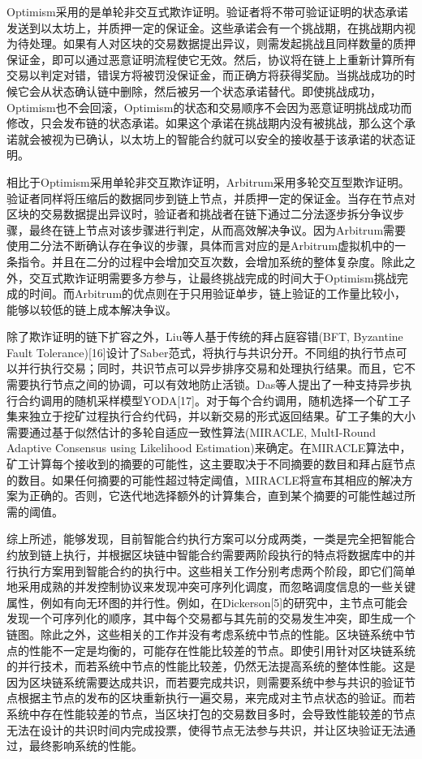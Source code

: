 Optimism采用的是单轮非交互式欺诈证明。验证者将不带可验证证明的状态承诺发送到以太坊上，并质押一定的保证金。这些承诺会有一个挑战期，在挑战期内视为待处理。如果有人对区块的交易数据提出异议，则需发起挑战且同样数量的质押保证金，即可以通过恶意证明流程使它无效。然后，协议将在链上上重新计算所有交易以判定对错，错误方将被罚没保证金，而正确方将获得奖励。当挑战成功的时候它会从状态确认链中删除，然后被另一个状态承诺替代。即使挑战成功，Optimism也不会回滚，Optimism的状态和交易顺序不会因为恶意证明挑战成功而修改，只会发布链的状态承诺。如果这个承诺在挑战期内没有被挑战，那么这个承诺就会被视为已确认，以太坊上的智能合约就可以安全的接收基于该承诺的状态证明。

相比于Optimism采用单轮非交互欺诈证明，Arbitrum采用多轮交互型欺诈证明。验证者同样将压缩后的数据同步到链上节点，并质押一定的保证金。当存在节点对区块的交易数据提出异议时，验证者和挑战者在链下通过二分法逐步拆分争议步骤，最终在链上节点对该步骤进行判定，从而高效解决争议。因为Arbitrum需要使用二分法不断确认存在争议的步骤，具体而言对应的是Arbitrum虚拟机中的一条指令。并且在二分的过程中会增加交互次数，会增加系统的整体复杂度。除此之外，交互式欺诈证明需要多方参与，让最终挑战完成的时间大于Optimism挑战完成的时间。而Arbitrum的优点则在于只用验证单步，链上验证的工作量比较小，能够以较低的链上成本解决争议。

除了欺诈证明的链下扩容之外，Liu等人基于传统的拜占庭容错(BFT, Byzantine Fault Tolerance)[16]设计了Saber范式，将执行与共识分开。不同组的执行节点可以并行执行交易；同时，共识节点可以异步排序交易和处理执行结果。而且，它不需要执行节点之间的协调，可以有效地防止活锁。Das等人提出了一种支持异步执行合约调用的随机采样模型YODA[17]。对于每个合约调用，随机选择一个矿工子集来独立于挖矿过程执行合约代码，并以新交易的形式返回结果。矿工子集的大小需要通过基于似然估计的多轮自适应一致性算法(MIRACLE, MultI-Round Adaptive Consensus using Likelihood Estimation)来确定。在MIRACLE算法中，矿工计算每个接收到的摘要的可能性，这主要取决于不同摘要的数目和拜占庭节点的数目。如果任何摘要的可能性超过特定阈值，MIRACLE将宣布其相应的解决方案为正确的。否则，它迭代地选择额外的计算集合，直到某个摘要的可能性越过所需的阈值。

综上所述，能够发现，目前智能合约执行方案可以分成两类，一类是完全把智能合约放到链上执行，并根据区块链中智能合约需要两阶段执行的特点将数据库中的并行执行方案用到智能合约的执行中。这些相关工作分别考虑两个阶段，即它们简单地采用成熟的并发控制协议来发现冲突可序列化调度，而忽略调度信息的一些关键属性，例如有向无环图的并行性。例如，在Dickerson[5]的研究中，主节点可能会发现一个可序列化的顺序，其中每个交易都与其先前的交易发生冲突，即生成一个链图。除此之外，这些相关的工作并没有考虑系统中节点的性能。区块链系统中节点的性能不一定是均衡的，可能存在性能比较差的节点。即使引用针对区块链系统的并行技术，而若系统中节点的性能比较差，仍然无法提高系统的整体性能。这是因为区块链系统需要达成共识，而若要完成共识，则需要系统中参与共识的验证节点根据主节点的发布的区块重新执行一遍交易，来完成对主节点状态的验证。而若系统中存在性能较差的节点，当区块打包的交易数目多时，会导致性能较差的节点无法在设计的共识时间内完成投票，使得节点无法参与共识，并让区块验证无法通过，最终影响系统的性能。

